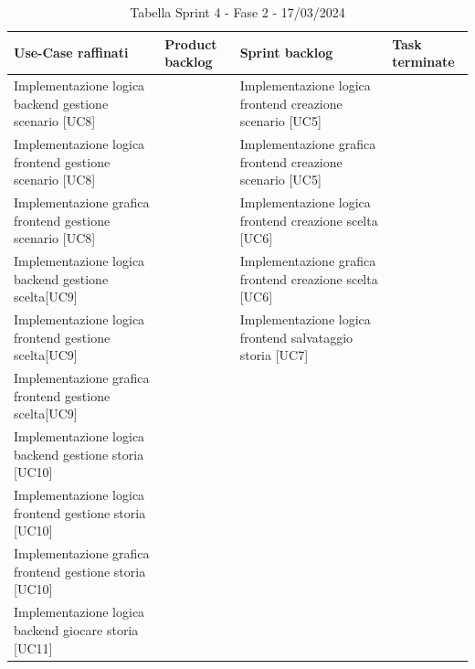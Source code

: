 \documentclass{article}
\begin{document}
\begin{table}[h]
    \centering
    \begin{tabularx}{\textwidth}{|X|X|X|X|}
        \hline
        \bf Use-Case raffinati & \bf Product backlog & \bf Sprint backlog & \bf Task terminate \\
        \hline
        Implementazione logica backend gestione scenario [UC8] & & Implementazione logica frontend creazione scenario [UC5] & \\
        \hline
        Implementazione logica frontend gestione scenario [UC8] & & Implementazione grafica frontend creazione scenario [UC5] & \\
        \hline
        Implementazione grafica frontend gestione scenario [UC8] & & Implementazione logica frontend creazione scelta [UC6] & \\
        \hline
        Implementazione logica backend gestione scelta[UC9] & & Implementazione grafica frontend creazione scelta [UC6] & \\
        \hline
        Implementazione logica frontend gestione scelta[UC9] & & Implementazione logica frontend salvataggio storia [UC7] & \\
        \hline
        Implementazione grafica frontend gestione scelta[UC9] & & & \\
        \hline
        Implementazione logica backend gestione storia [UC10] & & & \\
        \hline
        Implementazione logica frontend gestione storia [UC10] & & & \\
        \hline
        Implementazione grafica frontend gestione storia [UC10] & & & \\
        \hline
        Implementazione logica backend giocare storia [UC11] & & & \\
        \hline
    \end{tabularx}
    \caption*{Tabella Sprint 4 - Fase 2 - 17/03/2024}
\end{table}
\end{document}
